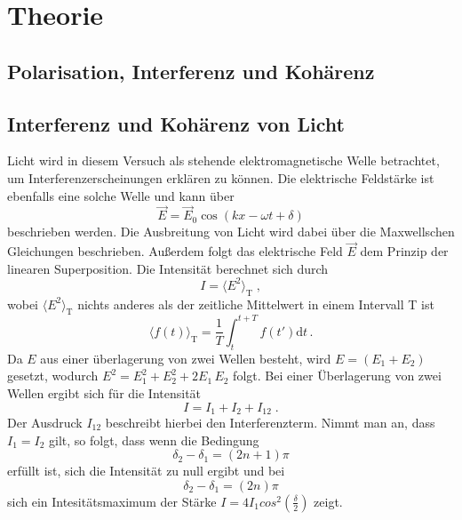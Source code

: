 \section{Theorie}
\label{sec:Theorie}

\subsection{Polarisation, Interferenz und Kohärenz}
\label{sec:polarisation}
\subsection{Interferenz und Kohärenz von Licht}
Licht wird in diesem Versuch als stehende elektromagnetische Welle betrachtet, um Interferenzerscheinungen erklären zu können. Die elektrische Feldstärke ist 
ebenfalls eine solche Welle und kann über 
\begin{equation*}
    \vec{E} = \vec{E}_0\cos{(kx- \omega t+ \delta)}
\end{equation*}
beschrieben werden. Die Ausbreitung von Licht wird dabei über die Maxwellschen Gleichungen beschrieben. Außerdem folgt das elektrische Feld 
$\vec{E}$ dem Prinzip der linearen Superposition.
Die Intensität berechnet sich durch 
\begin{equation*}
    I = \langle E^2\rangle _{\text{T}} \; ,
\end{equation*}
wobei $\langle E^2\rangle _{\text{T}}$ nichts anderes als der zeitliche Mittelwert in einem Intervall T ist
\begin{equation*}
    \langle f(t) \rangle _{\text{T}} = \frac{1}{T}\int_t^{t+T} f(t')\text{d}t \, .
\end{equation*}
Da $E$ aus einer überlagerung von zwei Wellen besteht, wird $E=(E_1+E_2)$ gesetzt, wodurch $E^2= E_1^2+E_2^2+2E_1\, E_2$ folgt.
Bei einer Überlagerung von zwei Wellen ergibt sich für die Intensität 
\begin{equation*}
    I = I_1 +I_2 +I_{12}\; .
\end{equation*}
Der Ausdruck $I_{12}$ beschreibt hierbei den Interferenzterm.
Nimmt man an, dass $I_1=I_2$ gilt, so folgt, dass
wenn die Bedingung
\begin{equation*}
    \delta_2 -\delta_1 = \left(2n+1\right)\pi 
\end{equation*}
erfüllt ist, sich die Intensität zu null ergibt und
bei 
\begin{equation*}
    \delta_2 -\delta_1 = \left(2n\right)\pi 
\end{equation*}
sich ein Intesitätsmaximum der Stärke $I=4I_1cos^2{\left(\frac{\delta}{2}\right)}$ zeigt.

